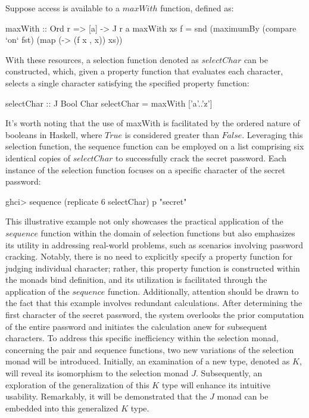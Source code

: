 \documentclass[runningheads]{llncs}
\begin{document}
Suppose access is available to a \(maxWith\) function, defined as:

\begin{code}
maxWith :: Ord r => [a] -> J r a
maxWith xs f = snd (maximumBy (compare `on` fst) 
                              (map (\x -> (f x , x)) xs))
\end{code}

With these resources, a selection function denoted as \(selectChar\) can
be constructed, which, given a property function that evaluates each
character, selects a single character satisfying the specified property
function:

\begin{code}
selectChar :: J Bool Char
selectChar = maxWith ['a'..'z']
\end{code}

It's worth noting that the use of maxWith is facilitated by the ordered
nature of booleans in Haskell, where \(True\) is considered greater than
\(False\). Leveraging this selection function, the sequence function can
be employed on a list comprising six identical copies of \(selectChar\)
to successfully crack the secret password. Each instance of the
selection function focuses on a specific character of the secret
password:

\begin{haskell}
ghci> sequence (replicate 6 selectChar) p
"secret"
\end{haskell}

This illustrative example not only showcases the practical application
of the \(sequence\) function within the domain of selection functions
but also emphasizes its utility in addressing real-world problems, such
as scenarios involving password cracking. Notably, there is no need to
explicitly specify a property function for judging individual character;
rather, this property function is constructed within the monads bind
definition, and its utilization is facilitated through the application
of the \(sequence\) function. Additionally, attention should be drawn to
the fact that this example involves redundant calculations. After
determining the first character of the secret password, the system
overlooks the prior computation of the entire password and initiates the
calculation anew for subsequent characters. To address this specific
inefficiency within the selection monad, concerning the pair and
sequence functions, two new variations of the selection monad will be
introduced. Initially, an examination of a new type, denoted as \(K\),
will reveal its isomorphism to the selection monad \(J\). Subsequently,
an exploration of the generalization of this \(K\) type will enhance its
intuitive usability. Remarkably, it will be demonstrated that the \(J\)
monad can be embedded into this generalized \(K\) type.
\end{document}
